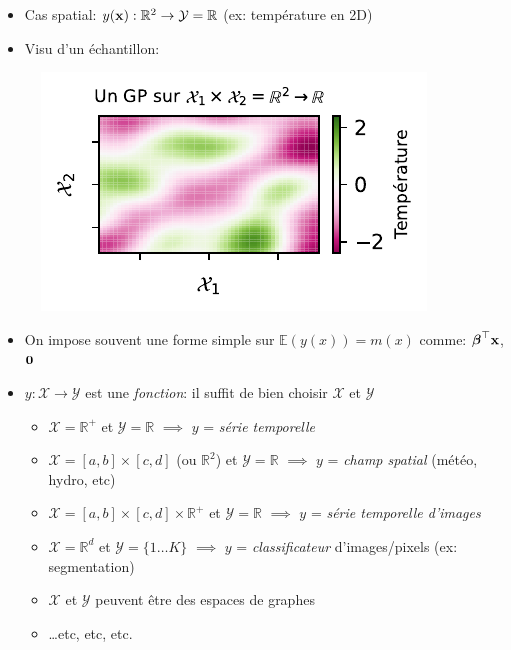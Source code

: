 \documentclass[xcolor=svgnames, t]{beamer}
\newcommand{\vectorx}[1]{\boldsymbol{\MakeLowercase{\mathbf{#1}}}}
\newcommand{\coloredemph}[1]{\textcolor{internationalblue}{\emph{#1}}}
\begin{document}
\begin{frame}{\subsecname}
  \begin{itemize}
    \item Cas spatial: $y(\vectorx{x}): \mathbb{R}^2 \to \mathcal{Y} = \mathbb{R}$ (ex: température en 2D)
    \item Visu d'un échantillon:%
  \end{itemize}%
  \begin{figure}
    \centering
    \includegraphics[scale=1]{1_gp_space_SquaredExponentialKernel.pdf}
  \end{figure}
\end{frame}

\begin{frame}{\subsecname}
  \begin{itemize}
    \item On impose souvent une forme simple sur $\mathbb{E}(y(x)) = m(x)$ 
    comme: $\vectorx{\beta}^\top \vectorx{x}$, $\vectorx{0}$
    \pause
    \item $y: \mathcal{X} \to \mathcal{Y}$ est une \coloredemph{fonction}: il suffit de bien choisir $\mathcal{X}$ et $\mathcal{Y}$
    \begin{itemize}
      \item $\mathcal{X} = \mathbb{R}^{+}$ et $\mathcal{Y} = \mathbb{R}$ $\implies$
      $y$ = \coloredemph{série temporelle} \cite{Rasmussen2006}
      \pause
      \item $\mathcal{X} = [a, b] \times [c, d]$ (ou $\mathbb{R}^2$) et  $\mathcal{Y} = \mathbb{R}$ $\implies$
      $y$ = \coloredemph{champ spatial} (météo, hydro, etc)
      \pause
      \item $\mathcal{X} = [a, b] \times [c, d] \times \mathbb{R}^{+}$ et $\mathcal{Y} = \mathbb{R}$ $\implies$
      $y$ = \coloredemph{série temporelle d'images}
      \pause
      \item $\mathcal{X} = \mathbb{R}^{d}$ et $\mathcal{Y} = \{1 \dots K \}$ $\implies$
      $y$ = \coloredemph{classificateur} d'images/pixels (ex: segmentation) \cite{Hensman2015}
      \item $\mathcal{X}$ et $\mathcal{Y}$ peuvent être des espaces de graphes \cite{Borovitskiy2021}
      \item \dots etc, etc, etc.
    \end{itemize}
  \end{itemize}
\end{frame}
\end{document}
